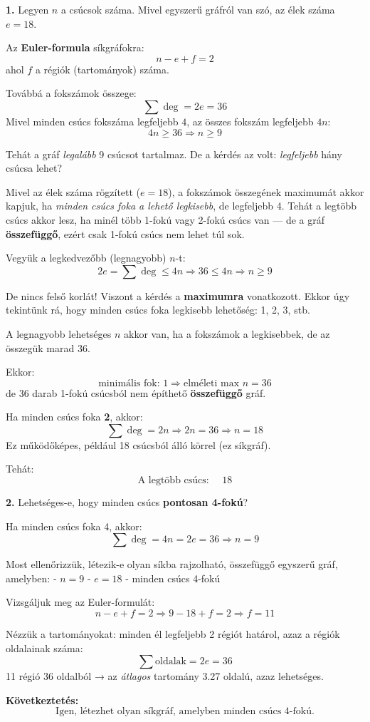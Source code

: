 \begin{solution}
	
	\textbf{1.} Legyen $n$ a csúcsok száma. Mivel egyszerű gráfról van szó, az élek száma $e = 18$.
	
	Az \textbf{Euler-formula} síkgráfokra:
	\[
	n - e + f = 2
	\]
	ahol $f$ a régiók (tartományok) száma.
	
	Továbbá a fokszámok összege:
	\[
	\sum \deg = 2e = 36
	\]
	Mivel minden csúcs fokszáma legfeljebb $4$, az összes fokszám legfeljebb $4n$:
	\[
	4n \geq 36 \Rightarrow n \geq 9
	\]
	
	Tehát a gráf \emph{legalább} 9 csúcsot tartalmaz. De a kérdés az volt: \emph{legfeljebb} hány csúcsa lehet?
	
	Mivel az élek száma rögzített ($e = 18$), a fokszámok összegének maximumát akkor kapjuk, ha \emph{minden csúcs foka a lehető legkisebb}, de legfeljebb 4. Tehát a legtöbb csúcs akkor lesz, ha minél több 1-fokú vagy 2-fokú csúcs van — de a gráf \textbf{összefüggő}, ezért csak 1-fokú csúcs nem lehet túl sok.
	
	Vegyük a legkedvezőbb (legnagyobb) $n$-t:
	\[
	2e = \sum \deg \leq 4n \Rightarrow 36 \leq 4n \Rightarrow n \geq 9
	\]
	
	De nincs felső korlát! Viszont a kérdés a \textbf{maximumra} vonatkozott. Ekkor úgy tekintünk rá, hogy minden csúcs foka legkisebb lehetőség: 1, 2, 3, stb.
	
	A legnagyobb lehetséges $n$ akkor van, ha a fokszámok a legkisebbek, de az összegük marad 36.
	
	Ekkor:
	\[
	\text{minimális fok: } 1 \Rightarrow \text{elméleti max } n = 36
	\]
	de 36 darab 1-fokú csúcsból nem építhető \textbf{összefüggő} gráf.
	
	Ha minden csúcs foka \textbf{2}, akkor:
	\[
	\sum \deg = 2n \Rightarrow 2n = 36 \Rightarrow n = 18
	\]
	Ez működőképes, például 18 csúcsból álló körrel (ez síkgráf).
	
	Tehát:
	\[
	\boxed{\text{A legtöbb csúcs: } \quad \boxed{18}}
	\]
	
	\medskip
	\textbf{2.} Lehetséges-e, hogy minden csúcs \textbf{pontosan 4-fokú}?
	
	Ha minden csúcs foka 4, akkor:
	\[
	\sum \deg = 4n = 2e = 36 \Rightarrow n = 9
	\]
	
	Most ellenőrizzük, létezik-e olyan síkba rajzolható, összefüggő egyszerű gráf, amelyben:
	- $n = 9$
	- $e = 18$
	- minden csúcs 4-fokú
	
	Vizsgáljuk meg az Euler-formulát:
	\[
	n - e + f = 2 \Rightarrow 9 - 18 + f = 2 \Rightarrow f = 11
	\]
	
	Nézzük a tartományokat: minden él legfeljebb 2 régiót határol, azaz a régiók oldalainak száma:
	\[
	\sum \text{oldalak} = 2e = 36
	\]
	11 régió 36 oldalból → az \emph{átlagos} tartomány 3.27 oldalú, azaz lehetséges.
	
	\textbf{Következtetés:}  
	\[
	\boxed{\text{Igen, létezhet olyan síkgráf, amelyben minden csúcs 4-fokú.}}
	\]
\end{solution}
